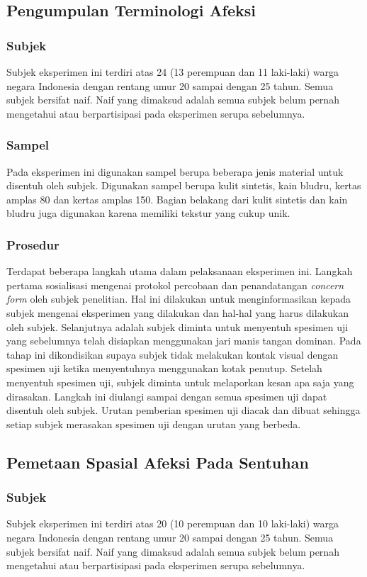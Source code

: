 \documentclass{Jurnal_kolo}
\begin{document}
\begin{multicols}{2}
	\subsection{Pengumpulan Terminologi Afeksi}
	\subsubsection{Subjek}
	\indent Subjek eksperimen ini terdiri atas 24 (13 perempuan dan 11 laki-laki) warga negara Indonesia dengan rentang umur 20 sampai dengan 25 tahun. Semua subjek bersifat naif. Naif yang dimaksud adalah semua subjek belum pernah mengetahui atau berpartisipasi pada eksperimen serupa sebelumnya.\\
	\subsubsection{Sampel}
	\indent Pada eksperimen ini digunakan sampel berupa beberapa jenis material untuk disentuh oleh subjek. Digunakan sampel berupa kulit sintetis, kain bludru, kertas amplas 80 dan kertas amplas 150. Bagian belakang dari kulit sintetis dan kain bludru juga digunakan karena memiliki tekstur yang cukup unik.   
	\subsubsection{Prosedur}
	\indent Terdapat beberapa langkah utama dalam pelaksanaan eksperimen ini. Langkah pertama sosialisasi mengenai protokol percobaan dan penandatangan \emph{concern form} oleh subjek penelitian. Hal ini dilakukan untuk menginformasikan kepada subjek mengenai eksperimen yang dilakukan dan hal-hal yang harus dilakukan oleh subjek. Selanjutnya adalah subjek diminta untuk menyentuh spesimen uji yang sebelumnya telah disiapkan menggunakan jari manis tangan dominan. Pada tahap ini dikondisikan supaya subjek tidak melakukan kontak visual dengan spesimen uji ketika menyentuhnya menggunakan kotak penutup. Setelah menyentuh spesimen uji, subjek diminta untuk melaporkan kesan apa saja yang dirasakan. Langkah ini diulangi sampai dengan semua spesimen uji dapat disentuh oleh subjek. Urutan pemberian spesimen uji diacak dan dibuat sehingga setiap subjek merasakan spesimen uji dengan urutan yang berbeda.
	
	\subsection{Pemetaan Spasial Afeksi Pada Sentuhan}
	\subsubsection{Subjek}
	\indent Subjek eksperimen ini terdiri atas 20 (10 perempuan dan 10 laki-laki) warga negara Indonesia dengan rentang umur 20 sampai dengan 25 tahun. Semua subjek bersifat naif. Naif yang dimaksud adalah semua subjek belum pernah mengetahui atau berpartisipasi pada eksperimen serupa sebelumnya.
	

\end{multicols}
\end{document}
